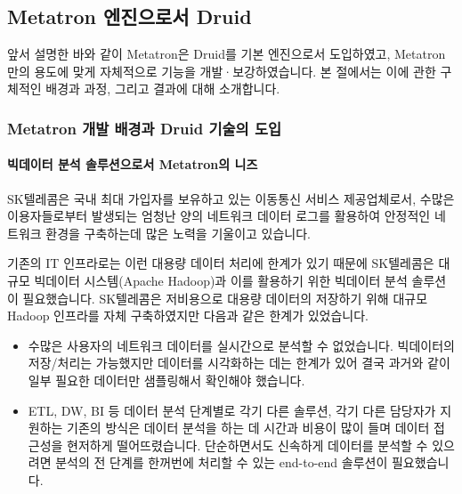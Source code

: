 \documentclass[letterpaper,10pt,english]{sphinxmanual}
\begin{document}
\subsection{Metatron 엔진으로서 Druid}
\label{\detokenize{discovery/part01/druid_to_metatron:metatron-druid}}\label{\detokenize{discovery/part01/druid_to_metatron::doc}}
앞서 설명한 바와 같이 Metatron은 Druid를 기본 엔진으로서 도입하였고, Metatron만의 용도에 맞게 자체적으로 기능을 개발·보강하였습니다. 본 절에서는 이에 관한 구체적인 배경과 과정, 그리고 결과에 대해 소개합니다.


\subsubsection{Metatron 개발 배경과 Druid 기술의 도입}
\label{\detokenize{discovery/part01/druid_to_metatron:id1}}

\paragraph{빅데이터 분석 솔루션으로서 Metatron의 니즈}
\label{\detokenize{discovery/part01/druid_to_metatron:metatron}}
SK텔레콤은 국내 최대 가입자를 보유하고 있는 이동통신 서비스 제공업체로서, 수많은 이용자들로부터 발생되는 엄청난 양의 네트워크 데이터 로그를 활용하여 안정적인 네트워크 환경을 구축하는데 많은 노력을 기울이고 있습니다.

기존의 IT 인프라로는 이런 대용량 데이터 처리에 한계가 있기 때문에 SK텔레콤은 대규모 빅데이터 시스템(Apache Hadoop)과 이를 활용하기 위한 빅데이터 분석 솔루션이 필요했습니다. SK텔레콤은 저비용으로 대용량 데이터의 저장하기 위해 대규모 Hadoop 인프라를 자체 구축하였지만 다음과 같은 한계가 있었습니다.
\begin{itemize}
\item {} 
수많은 사용자의 네트워크 데이터를 실시간으로 분석할 수 없었습니다. 빅데이터의 저장/처리는 가능했지만 데이터를 시각화하는 데는 한계가 있어 결국 과거와 같이 일부 필요한 데이터만 샘플링해서 확인해야 했습니다.

\item {} 
ETL, DW, BI 등 데이터 분석 단계별로 각기 다른 솔루션, 각기 다른 담당자가 지원하는 기존의 방식은 데이터 분석을 하는 데 시간과 비용이 많이 들며 데이터 접근성을 현저하게 떨어뜨렸습니다. 단순하면서도 신속하게 데이터를 분석할 수 있으려면 분석의 전 단계를 한꺼번에 처리할 수 있는 end-to-end 솔루션이 필요했습니다.

\end{itemize}
\end{document}
